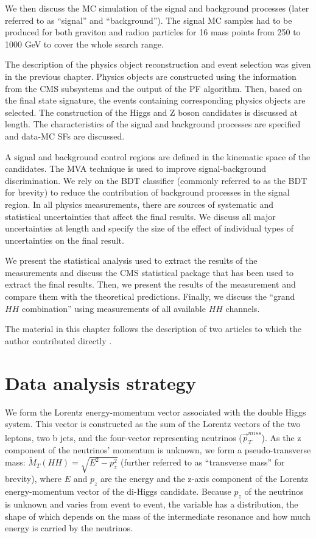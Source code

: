 We then discuss the MC simulation of the signal and background processes (later referred to as ``signal'' and ``background''). The signal MC samples had to be produced for both graviton and radion particles for 16 mass points from 250 to 1000 GeV to cover the whole search range. 

The description of the physics object reconstruction and event selection was given in the previous chapter. Physics objects are constructed using the information from the CMS subsystems and the output of the PF algorithm. Then, based on the final state signature, the events containing corresponding physics objects are selected. The construction of the Higgs and Z boson candidates is discussed at length. The characteristics of the signal and background processes are specified and data-MC SFs are discussed.

A signal and background control regions are defined in the kinematic space of the candidates. The MVA technique is used to improve signal-background discrimination. We rely on the BDT classifier (commonly referred to as the BDT for brevity) to reduce the contribution of background processes in the signal region. In all physics measurements, there are sources of systematic and statistical uncertainties that affect the final results. We discuss all major uncertainties at length and specify the size of the effect of individual types of uncertainties on the final result. 

We present the statistical analysis used to extract the results of the measurements and discuss the CMS statistical package that has been used to extract the final results. Then, we present the results of the measurement and compare them with the theoretical predictions. Finally, we discuss the ``grand $HH$ combination'' using measurements of all available $HH$ channels.

The material in this chapter follows the description of two articles to which the author contributed directly \cite{bbZZAN, CMS-PAS-HIG-17-032}.

\section{Data analysis strategy}
\label{sec:strategy}
We form the Lorentz energy-momentum vector associated with the double Higgs system. This vector is constructed as the sum of the Lorentz vectors of the two leptons, two b jets, and the four-vector representing neutrinos ($\vec{p}^{miss}_T$). As the z component of the neutrinos' momentum is unknown, we form a pseudo-transverse mass:
$\tilde{M}_T(HH) = \sqrt{E^2 - p_{z}^2}$ (further referred to as ``transverse mass'' for brevity), where $E$ and $p_z$ are the energy and the z-axis component of the Lorentz energy-momentum vector of the di-Higgs candidate. Because $p_z$ of the neutrinos is unknown and varies from event to event, the variable \mTHH has a distribution, the shape of which depends on the mass of the intermediate resonance and how much energy is carried by the neutrinos.

